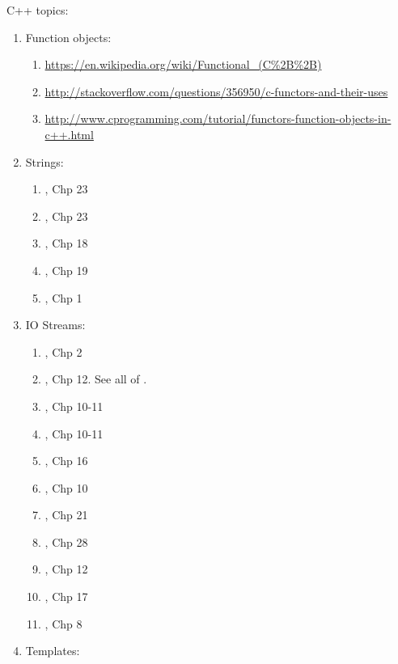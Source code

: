 C++ topics: \vspace{-0.3cm}
\begin{enumerate} \itemsep -4pt
\item Function objects: \vspace{-0.3cm}
	\begin{enumerate} \itemsep -2pt
	\item \url{https://en.wikipedia.org/wiki/Functional_(C%2B%2B)}
	\item \url{http://stackoverflow.com/questions/356950/c-functors-and-their-uses}
	\item \url{http://www.cprogramming.com/tutorial/functors-function-objects-in-c++.html}
	\end{enumerate}
\item Strings: \vspace{-0.3cm}
	\begin{enumerate} \itemsep -2pt
	\item \cite{Stroustrup2014}, Chp 23
	\item \cite{Stroustrup2009}, Chp 23
	\item \cite{Gregoire2014}, Chp 18
	\item \cite{Allain2012}, Chp 19
	\item \cite{Eckel2003}, Chp 1
	\end{enumerate}
\item IO Streams: \vspace{-0.3cm}
	\begin{enumerate} \itemsep -2pt
	\item \cite{Eckel2003}, Chp 2
	\item \cite{Gaddis2010}, Chp 12. See all of \cite{Gaddis2010,Gaddis2011,Gaddis2012}.
	\item \cite{Stroustrup2014}, Chp 10-11
	\item \cite{Stroustrup2009}, Chp 10-11
	\item \cite{Oualline2003}, Chp 16
	\item \cite{Vermeir2001}, Chp 10
	\item \cite{Schildt2003}, Chp 21
	\item \cite{Allain2012}, Chp 28
	\item \cite{Gregoire2014}, Chp 12
	\item \cite{Prata2012}, Chp 17
	\item \cite{Lippman2013}, Chp 8
	\end{enumerate}
\item Templates: \vspace{-0.3cm}
	\begin{enumerate} \itemsep -2pt

\end{enumerate}
\end{enumerate}
